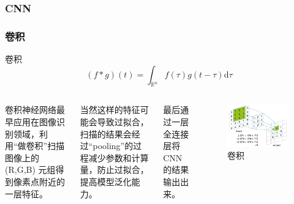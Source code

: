 \subsubsection{CNN}
\begin{frame}
    \frametitle{卷积}
    \begin{definition}{卷积}
        \begin{equation}
            (f*g)(t)=\int_{\mathbb{R}^n}f(\tau)g(t-\tau)\mathrm{d}\tau
        \end{equation}
    \end{definition}
    \begin{columns}
        卷积神经网络最早应用在图像识别领域，利用“做卷积”扫描图像上的 (R,G,B) 元组得到像素点附近的一层特征。

        当然这样的特征可能会导致过拟合，扫描的结果会经过“pooling”的过程减少参数和计算量，防止过拟合，提高模型泛化能力。

        最后通过一层全连接层将CNN的结果输出出来。
        \begin{figure}
            \includegraphics[width=\linewidth]{../lib/CNN.jpeg}
            \caption{卷积}
            \label{CNN}
        \end{figure}
    \end{columns}

\end{frame}
